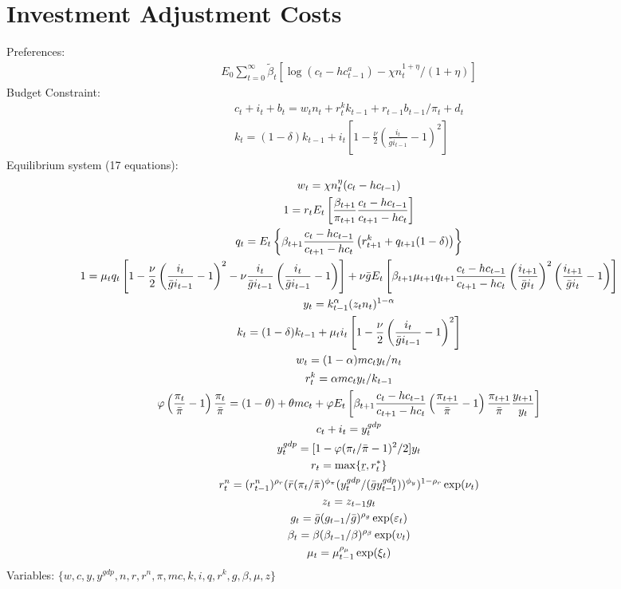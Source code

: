 \documentclass[12pt, final]{article}
\newcommand{\ubar}[1]{\underaccent{\bar}{#1}}
\begin{document}
\section{Investment Adjustment Costs}

Preferences:
\begin{gather*}
 E_0\sum_{t=0}^\infty\tilde{\beta}_t[\log(c_t-hc_{t-1}^a)-\chi n_t^{1+\eta}/(1+\eta)] 
\end{gather*}
Budget Constraint:
\begin{gather*}
  c_t+i_t+b_t=w_tn_t+r_t^kk_{t-1}+r_{t-1}b_{t-1}/\pi_t+d_t\\
  k_t=(1-\delta)k_{t-1}+i_t\left[1-\frac{\nu}{2}\left(\frac{i_t}{\bar{g}i_{t-1}}-1\right)^2\right]
\end{gather*}
Equilibrium system (17 equations):
\scriptsize\begin{gather}
  w_t=\chi n_t^\eta(c_t-hc_{t-1})\\
  1= r_tE_t\left[\frac{\beta_{t+1}}{\pi_{t+1}}\frac{c_t-hc_{t-1}}{c_{t+1}-hc_t}\right]\\
  q_t = E_t\left\{\beta_{t+1}\frac{c_t-hc_{t-1}}{c_{t+1}-hc_t}\left(r_{t+1}^k+q_{t+1}(1-\delta)\right)\right\}\\
  1 = \mu_tq_t\left[1-\frac{\nu}{2}\left(\frac{i_t}{\bar{g}i_{t-1}}-1\right)^2-\nu\frac{i_t}{\bar{g}i_{t-1}}\left(\frac{i_t}{\bar{g}i_{t-1}}-1\right)\right]+\nu\bar{g}
  E_t\left[\beta_{t+1}\mu_{t+1}q_{t+1}\frac{c_t-hc_{t-1}}{c_{t+1}-hc_t}\left(\frac{i_{t+1}}{\bar{g}i_t}\right)^2\left(\frac{i_{t+1}}{\bar{g}i_t}-1\right)\right]\\
  y_t=k_{t-1}^\alpha(z_tn_t)^{1-\alpha}\\
  k_t=(1-\delta)k_{t-1}+\mu_ti_t\left[1-\frac{\nu}{2}\left(\frac{i_{t}}{\bar{g}i_{t-1}}-1\right)^2\right]\\
  w_t = (1-\alpha)mc_ty_t/n_t\\
  r_t^k = \alpha mc_ty_t/k_{t-1}\\
  \varphi\left(\frac{\pi_t}{\bar{\pi}}-1\right)\frac{\pi_t}{\bar{\pi}} = (1-\theta) + \theta mc_t + \varphi E_t\left[\beta_{t+1}\frac{c_t-hc_{t-1}}{c_{t+1}-hc_t}\left(\frac{\pi_{t+1}}{\bar{\pi}}-1\right)\frac{\pi_{t+1}}{\bar{\pi}}\frac{y_{t+1}}{y_t}\right]\\
  c_t+i_t=y_t^{gdp}\\
  y_t^{gdp} = [1-\varphi(\pi_t/\bar{\pi}-1)^2/2]y_t\\
  r_t=\max\{\ubar{r},r_t^*\}\\
   r_t^n=(r_{t-1}^n)^{\rho_r}(\bar{r}(\pi_t/\bar{\pi})^{\phi_\pi}(y_t^{gdp}/(\bar{g}y_{t-1}^{gdp}))^{\phi_y})^{1-\rho_r}\exp(\nu_t)\\
  z_t=z_{t-1}g_t\\
  g_t=\bar{g}(g_{t-1}/\bar{g})^{\rho_g}\exp(\varepsilon_t)\\
  \beta_t=\beta(\beta_{t-1}/\beta)^{\rho_\beta}\exp(\upsilon_t)\\
  \mu_t=\mu_{t-1}^{\rho_\mu}\exp(\xi_t)
\end{gather}\normalsize
Variables: $\{w,c,y,y^{gdp},n,r,r^n,\pi,mc,k,i,q,r^k,g,\beta,\mu,z\}$\\
\end{document}
